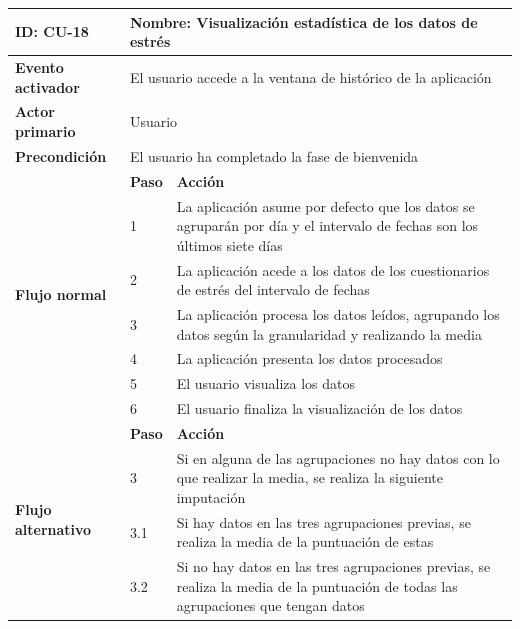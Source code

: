             \begin{table}[h]
                \centering
                \begin{tabularx}{\textwidth}{|l|l|X|}
                    \hline
                    \textbf{ID:} CU-18 & \multicolumn{2}{|X|}{\textbf{Nombre}: Visualización estadística de los datos de estrés} \\
                    \hline
                    \textbf{Evento activador} & \multicolumn{2}{|X|}{El usuario accede a la ventana de histórico de la aplicación} \\
                    \hline
                    \textbf{Actor primario} & \multicolumn{2}{|X|}{Usuario} \\
                    \hline
                    \textbf{Precondición} & \multicolumn{2}{|X|}{El usuario ha completado la fase de bienvenida} \\
                    \hline
                    \multirow{7}{*}{\textbf{Flujo normal}} & \textbf{Paso} & \textbf{Acción} \\
                    \cline{2-3} & 1 & La aplicación asume por defecto que los datos se agruparán por día y el intervalo de fechas son los últimos siete días \\
                    \cline{2-3} & 2 & La aplicación acede a los datos de los cuestionarios de estrés del intervalo de fechas \\
                    \cline{2-3} & 3 & La aplicación procesa los datos leídos, agrupando los datos según la granularidad y realizando la media \\
                    \cline{2-3} & 4 & La aplicación presenta los datos procesados \\
                    \cline{2-3} & 5 & El usuario visualiza los datos \\
                    \cline{2-3} & 6 & El usuario finaliza la visualización de los datos \\
                    \hline
                    \multirow{5}{*}{\textbf{Flujo alternativo}} & \textbf{Paso} & \textbf{Acción} \\
                    \cline{2-3} & 3 & Si en alguna de las agrupaciones no hay datos con lo que realizar la media, se realiza la siguiente imputación \\
                    \cline{2-3} & 3.1 & Si hay datos en las tres agrupaciones previas, se realiza la media de la puntuación de estas \\
                    \cline{2-3} & 3.2 & Si no hay datos en las tres agrupaciones previas, se realiza la media de la puntuación de todas las agrupaciones que tengan datos \\

\end{tabularx}
\end{table}
